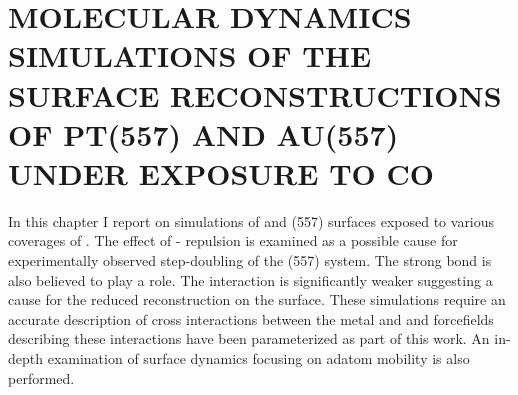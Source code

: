 \chapter{MOLECULAR DYNAMICS SIMULATIONS OF THE SURFACE RECONSTRUCTIONS OF PT(557) AND AU(557) UNDER EXPOSURE TO CO}
\label{chap:PtAu}





In this chapter I report on simulations of  and  (557) surfaces
exposed to various coverages of . The effect of -
repulsion is examined as a possible cause for experimentally observed
step-doubling of the  (557) system. The strong  bond is
also believed to play a role. The  interaction is
significantly weaker suggesting a cause for the reduced reconstruction on the
 surface. These simulations require an accurate description of cross
interactions between the metal and  and forcefields describing these
interactions have been parameterized as part of this work. An in-depth
examination of surface dynamics focusing on adatom mobility is also performed.




